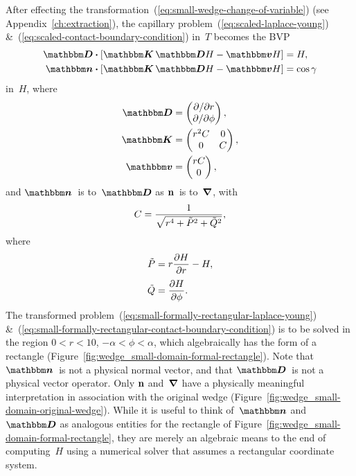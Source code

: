 After effecting the transformation~(\ref{eq:small-wedge-change-of-variable})
(see Appendix~\ref{ch:extraction}),
the capillary problem~(\ref{eq:scaled-laplace-young})
\&~(\ref{eq:scaled-contact-boundary-condition}) in~$T$
becomes the BVP
\begin{align}
  \matder \dotp \squarebr[\bulkysize]{\mat{K} \matder H - \mat{v} H}
    &= H,
    \label{eq:small-formally-rectangular-laplace-young} \\
  \mat{n} \dotp \squarebr[\bulkysize]{\mat{K} \matder H - \mat{v} H}
    &= \cos\gamma
    \label{eq:small-formally-rectangular-contact-boundary-condition}
\end{align}
in~$H$, where
\begin{align}
  \matder &=
    \begin{pmatrix}
      \pd / {\pd r} \\
      \pd / {\pd\phi}
    \end{pmatrix},
    \label{eq:small-formally-rectangular-derivative} \\
  \saveequation{
    \mat{K}
  }{&=}{
    \begin{pmatrix}
      r^2 C & 0 \\
      0 & C
    \end{pmatrix}
  }{eq:small-formally-rectangular-diffusion-coefficient}, \\
  \saveequation{
    \mat{v}
  }{&=}{
    \begin{pmatrix}
      r C \\
      0
    \end{pmatrix}
  }{eq:small-formally-rectangular-convection-coefficient},
\end{align}
and $\mat{n}$~is to~$\matder$ as $\mathop{}\!\boldsymbol{\mathbf{n}}$~is to~$\mathop{}\!\boldsymbol{\mathbf{\nabla}}$,
with
\begin{equation}
  \savecontent{
    C = \frac{1}{\sqrt{r^4 + \desing{P}^2 + \desing{Q}^2}}
  }{eq:small-formally-rectangular-scalar-coefficient},
\end{equation}
where
\begin{align}
  \desing{P} &= r \pder{H}{r} - H,
    \label{eq:small-gradient-de-singularised-r-component}
    \\[\tallspace]
  \desing{Q} &= \pder{H}{\phi}.
    \label{eq:small-gradient-de-singularised-phi-component}
\end{align}
The transformed problem~(\ref{eq:small-formally-rectangular-laplace-young})
\&~(\ref{eq:small-formally-rectangular-contact-boundary-condition})
is to be solved in the region
$0 < r < 10$, $-\alpha < \phi < \alpha$,
which algebraically has the form of a rectangle
(Figure~\ref{fig:wedge_small-domain-formal-rectangle}).
Note that $\mat{n}$~is not a physical normal vector,
and that $\matder$~is not a physical vector operator.
Only $\mathop{}\!\boldsymbol{\mathbf{n}}$ and~$\mathop{}\!\boldsymbol{\mathbf{\nabla}}$ have a physically meaningful interpretation
in association with the original wedge
(Figure~\ref{fig:wedge_small-domain-original-wedge}).
While it is useful to think of~$\mat{n}$ and~$\matder$
as analogous entities for the rectangle of
Figure~\ref{fig:wedge_small-domain-formal-rectangle},
they are merely an algebraic means to the end of computing~$H$
using a numerical solver that assumes a rectangular coordinate system.

